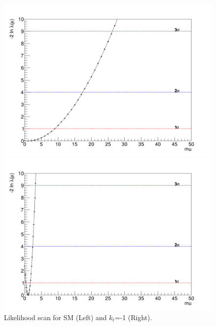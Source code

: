 \begin{linenumbers}
\begin{figure}[!htbp]
	\centering
	\begin{minipage}[b]{0.48\textwidth}
		\includegraphics[width=\textwidth]{Chapter4/Likelihood.png}
	\end{minipage}
	\hfill
	\begin{minipage}[b]{0.48\textwidth}
		\includegraphics[width=\textwidth]{Chapter4/Likelihood-kt-1.png}
	\end{minipage}
	\caption{Likelihood scan for SM (Left) and $k_t$=-1 (Right).}
	\label{scanl}
\end{figure}


\end{linenumbers}
